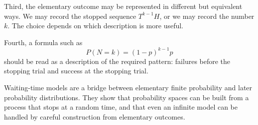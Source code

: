 Third, the elementary outcome may be represented in different but equivalent
ways. We may record the stopped sequence \(T^{k-1}H\), or we may record the
number \(k\). The choice depends on which description is more useful.

Fourth, a formula such as
\[
P(N=k)=(1-p)^{k-1}p
\]
should be read as a description of the required pattern: failures before the
stopping trial and success at the stopping trial.

\begin{remarkbox}
Waiting-time models are a bridge between elementary finite probability and later
probability distributions. They show that probability spaces can be built from a
process that stops at a random time, and that even an infinite model can be
handled by careful construction from elementary outcomes.
\end{remarkbox}
